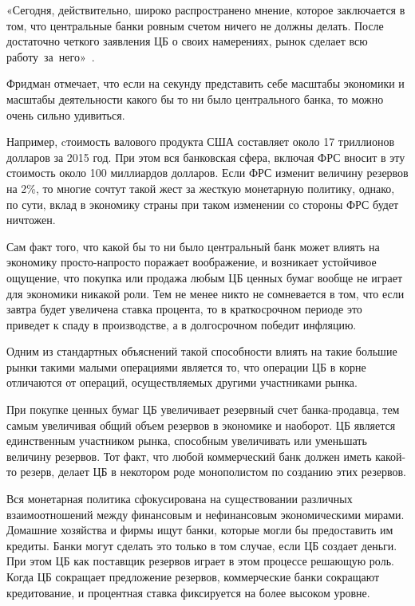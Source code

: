 \documentclass[14pt,a4paper, oneside]{extreport}
\theoremstyle{plain}              %
\theoremstyle{definition}         %
\begin{document}
«Сегодня, действительно, широко распространено мнение, которое заключается в том, что центральные банки ровным счетом ничего не должны делать. После достаточно четкого заявления ЦБ о своих намерениях, рынок сделает всю работу~за~него»~\cite{friedman1999future}.

Фридман отмечает, что если на секунду представить себе масштабы экономики и масштабы деятельности какого бы то ни было центрального банка, то можно очень сильно удивиться. 

Например, cтоимость валового продукта США составляет около 17 триллионов долларов за 2015 год. При этом вся банковская сфера, включая ФРС вносит в эту стоимость около 100 миллиардов долларов. Если ФРС изменит величину резервов на 2\%, то многие сочтут такой жест за жесткую монетарную политику, однако, по сути, вклад в экономику страны при таком изменении со стороны ФРС будет ничтожен. 

Сам факт того, что какой бы то ни было центральный банк может влиять на экономику просто-напросто поражает воображение, и возникает устойчивое ощущение, что покупка или продажа любым ЦБ ценных бумаг вообще не играет для экономики никакой роли. Тем не менее никто не сомневается в том, что если завтра будет увеличена ставка процента, то в краткосрочном периоде это приведет к спаду в производстве, а в долгосрочном победит инфляцию. 

Одним из стандартных объяснений такой способности влиять на такие большие рынки такими малыми операциями является то, что операции ЦБ в корне отличаются от операций, осуществляемых другими участниками рынка.

При покупке ценных бумаг ЦБ увеличивает резервный счет банка-продавца, тем самым увеличивая общий объем резервов в экономике и наоборот. ЦБ является единственным участником рынка, способным увеличивать или уменьшать величину резервов. Тот факт, что любой коммерческий банк должен иметь какой-то резерв, делает ЦБ в некотором роде монополистом по созданию этих резервов. 

Вся монетарная политика сфокусирована на существовании различных взаимоотношений между финансовым  и нефинансовым экономическими мирами. Домашние хозяйства и фирмы ищут банки, которые могли бы предоставить им кредиты. Банки могут сделать это только в том случае, если ЦБ создает деньги. При этом ЦБ как поставщик резервов играет в этом процессе решающую роль. Когда ЦБ сокращает предложение резервов, коммерческие банки сокращают кредитование, и процентная ставка фиксируется на более высоком уровне. 
\end{document}
